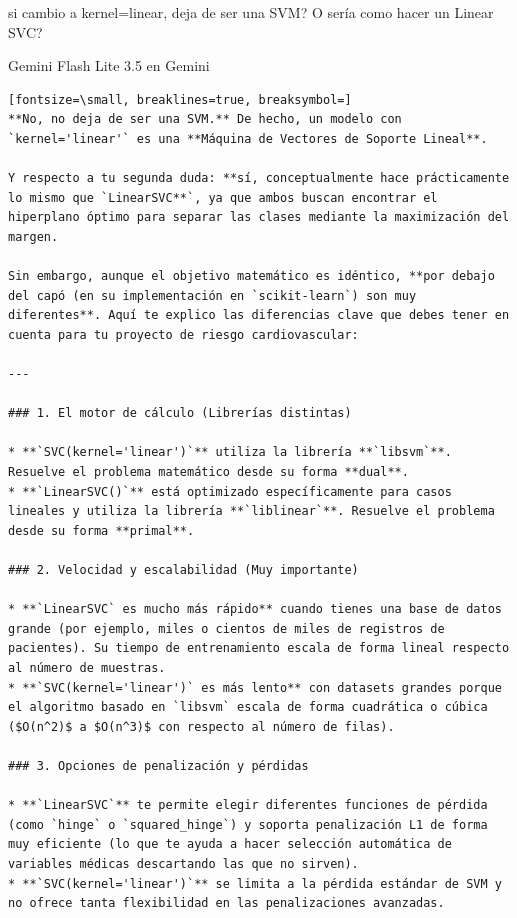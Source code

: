 \documentclass[12pt,a4paper,oneside]{book}
\begin{document}
\begin{iaprompt}
si cambio a kernel=linear, deja de ser una SVM? O sería como hacer un Linear SVC?
\end{iaprompt}
\begin{iaresp}{Gemini Flash Lite 3.5 en Gemini}
\begin{Verbatim}[fontsize=\small, breaklines=true, breaksymbol=]
**No, no deja de ser una SVM.** De hecho, un modelo con `kernel='linear'` es una **Máquina de Vectores de Soporte Lineal**.

Y respecto a tu segunda duda: **sí, conceptualmente hace prácticamente lo mismo que `LinearSVC**`, ya que ambos buscan encontrar el hiperplano óptimo para separar las clases mediante la maximización del margen.

Sin embargo, aunque el objetivo matemático es idéntico, **por debajo del capó (en su implementación en `scikit-learn`) son muy diferentes**. Aquí te explico las diferencias clave que debes tener en cuenta para tu proyecto de riesgo cardiovascular:

---

### 1. El motor de cálculo (Librerías distintas)

* **`SVC(kernel='linear')`** utiliza la librería **`libsvm`**. Resuelve el problema matemático desde su forma **dual**.
* **`LinearSVC()`** está optimizado específicamente para casos lineales y utiliza la librería **`liblinear`**. Resuelve el problema desde su forma **primal**.

### 2. Velocidad y escalabilidad (Muy importante)

* **`LinearSVC` es mucho más rápido** cuando tienes una base de datos grande (por ejemplo, miles o cientos de miles de registros de pacientes). Su tiempo de entrenamiento escala de forma lineal respecto al número de muestras.
* **`SVC(kernel='linear')` es más lento** con datasets grandes porque el algoritmo basado en `libsvm` escala de forma cuadrática o cúbica ($O(n^2)$ a $O(n^3)$ con respecto al número de filas).

### 3. Opciones de penalización y pérdidas

* **`LinearSVC`** te permite elegir diferentes funciones de pérdida (como `hinge` o `squared_hinge`) y soporta penalización L1 de forma muy eficiente (lo que te ayuda a hacer selección automática de variables médicas descartando las que no sirven).
* **`SVC(kernel='linear')`** se limita a la pérdida estándar de SVM y no ofrece tanta flexibilidad en las penalizaciones avanzadas.


\end{Verbatim}
\end{iaresp}
\end{document}
